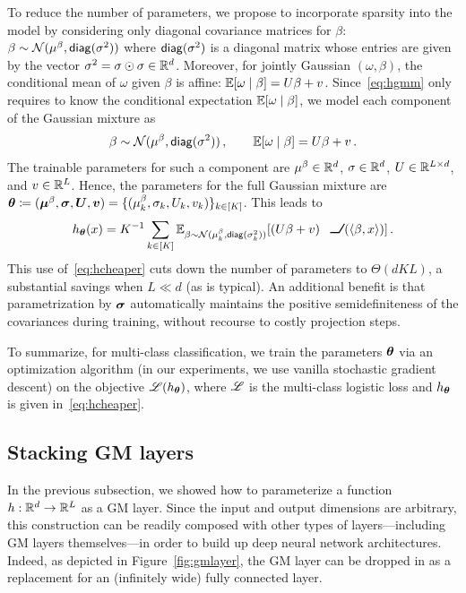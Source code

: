\documentclass{custom}
\begin{document}
 To reduce the number of parameters, we propose to incorporate sparsity into the model by considering only diagonal covariance matrices for $\beta$: $\beta\sim\mathcal{N}(\mu^\beta,\operatorname{\mathsf{diag}} (\sigma^2))$ where $\operatorname{\mathsf{diag}} (\sigma^2)$ is a diagonal matrix whose entries are given by the vector $\sigma^2=\sigma\odot \sigma \in \mathbb R^d$. Moreover, for jointly Gaussian $(\omega,\beta)$, the conditional mean of $\omega$ given $\beta$ is affine:  $\mathbb E[\omega\mid\beta] = U\beta+v$. Since~\eqref{eq:hgmm} only requires to know the conditional expectation $\mathbb E[\omega\mid\beta]$, we model each component of the Gaussian mixture as
\[
\beta\sim\mathcal{N}(\mu^\beta,\operatorname{\mathsf{diag}} (\sigma^2))\,,\qquad \mathbb E[\omega\mid\beta] = U\beta+v\,.
\]
The trainable parameters for such a component are $\mu^\beta \in \mathbb R^d$, $\sigma \in \mathbb R^d$, $U \in \mathbb R^{L\times d}$, and $v\in\mathbb R^{L}$.
Hence, the parameters for the full Gaussian mixture are $\boldsymbol \theta \coloneqq (\boldsymbol \mu^\beta,\boldsymbol \sigma,\boldsymbol U, \boldsymbol v) = \{(\mu^\beta_k, \sigma_k, U_k, v_k)\}_{k\in [K]}$.
This leads to
\begin{align}\label{eq:hcheaper}
    h_{\bs\theta}(x) = K^{-1} \sum_{k\in [K]} \E_{\beta\sim \mc N(\mu_k^\beta, \diag(\sigma_k^2))}[(U\beta + v)\,\ReLU(\langle \beta,x\rangle)]\,.
\end{align}
This use of~\eqref{eq:hcheaper} cuts down the number of parameters to $\Theta(dKL)$, a substantial savings when $L \ll d$ (as is typical).
An additional benefit is that parametrization by $\boldsymbol \sigma$ automatically maintains the positive semidefiniteness of the covariances during training, without recourse to costly projection steps.

To summarize, for multi-class classification, we train the parameters $\boldsymbol \theta$ via an optimization algorithm (in our experiments, we use vanilla stochastic gradient descent) on the objective $\mathscr L(h_{\boldsymbol \theta})$, where $\mathscr L$ is the multi-class logistic loss and $h_{\boldsymbol \theta}$ is given in~\eqref{eq:hcheaper}.


\subsection{Stacking GM layers}


In the previous subsection, we showed how to parameterize a function $h : \mathbb R^d\to\mathbb R^{L}$ as a GM layer.
Since the input and output dimensions are arbitrary, this construction can be readily composed with other types of layers---including GM layers themselves---in order to build up deep neural network architectures. Indeed, as depicted in Figure~\ref{fig:gmlayer}, the GM layer can be dropped in as a replacement for an (infinitely wide) fully connected layer. 
\end{document}

